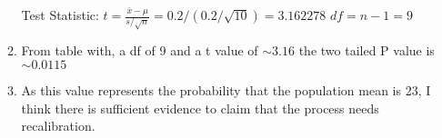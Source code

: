 \documentclass[11pt]{article}
\begin{document}
\begin{preview}
\begin{enumerate}
\begin{enumerate}
                Test Statistic: $t = \frac{\bar{x}-\mu}{s/\sqrt{n}} = 0.2 / (0.2/\sqrt{10})=3.162278$
                $df = n-1 = 9$ \\

                \item From table with, a df of 9 and a t value of $\sim 3.16$ the two tailed P value is $\sim 0.0115$

                \item As this value represents the probability that the population mean is 23, I think there is sufficient evidence to claim that the process needs recalibration.
        \end{enumerate} 
\end{enumerate}

\end{preview}
\end{document}
